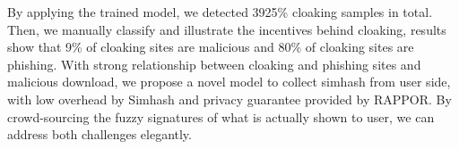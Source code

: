 By applying the trained model, we detected 3925\% cloaking samples in total.
Then, we manually classify and illustrate the incentives behind cloaking,
results show that 9\% of cloaking sites are malicious and 80\% of cloaking sites
are phishing. With strong relationship between cloaking and phishing sites
and malicious download,  we propose a novel model to collect simhash
%
%
from user side, with low overhead by Simhash and privacy guarantee provided by RAPPOR.
By crowd-sourcing the fuzzy signatures of what is actually shown to user, we can
address both challenges elegantly.


%




%

%
%

